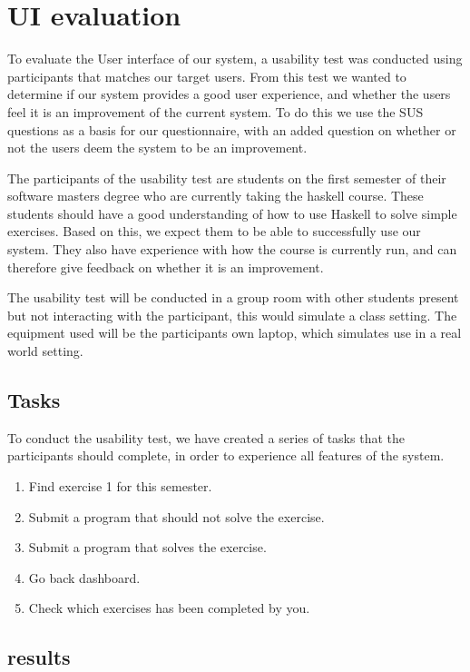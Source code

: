 \section{UI evaluation}
To evaluate the User interface of our system, a usability test was conducted using participants that matches our target users. From this test we wanted to determine if our system provides a good user experience, and whether the users feel it is an improvement of the current system.
To do this we use the SUS questions as a basis for our questionnaire, with an added question on whether or not the users deem the system to be an improvement.

The participants of the usability test are students on the first semester of their software masters degree who are currently taking the haskell course. 
These students should have a good understanding of how to use Haskell to solve simple exercises. Based on this, we expect them to be able to successfully use our system. They also have experience with how the course is currently run, and can therefore give feedback on whether it is an improvement.

The usability test will be conducted in a group room with other students present but not interacting with the participant, this would simulate a class setting. 
The equipment used will be the participants own laptop, which simulates use in a real world setting.

\subsection*{Tasks}
To conduct the usability test, we have created a series of tasks that the participants should complete, in order to experience all features of the system.

\begin{enumerate}
    \item Find exercise 1 for this semester.
    \item Submit a program that should not solve the exercise.
    \item Submit a program that solves the exercise.
    \item Go back dashboard.
    \item Check which exercises has been completed by you.
\end{enumerate}



\subsection*{results}
